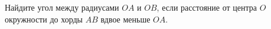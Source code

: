 \begin{ex}
	\begin{condition}
		Найдите угол между радиусами \( OA  \) и \( OB \), если расстояние от центра \( O  \) окружности до хорды \( AB \) вдвое меньше \( OA \).
	\end{condition}
	\answer{\( 120\degree \)}
\end{ex}